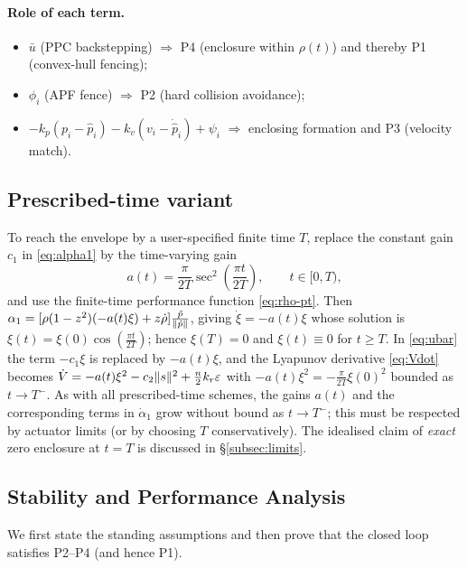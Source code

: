 \paragraph{Role of each term.}
\begin{itemize}
    \item $\bar u$ (PPC backstepping) $\Rightarrow$ P4 (enclosure within
    $\rho(t)$) and thereby P1 (convex-hull fencing);
    \item $\phi_i$ (APF fence) $\Rightarrow$ P2 (hard collision avoidance);
    \item $-k_p(p_i-\hat p_i)-k_v(v_i-\dot{\hat p}_i)+\psi_i$
    $\Rightarrow$ enclosing formation and P3 (velocity match).
\end{itemize}

\subsection{Prescribed-time variant}
\label{subsec:pt}

To reach the envelope by a user-specified finite time $T$, replace the
constant gain $c_1$ in \eqref{eq:alpha1} by the time-varying gain
\begin{equation}
a(t) = \frac{\pi}{2T}\sec^2\!\left(\frac{\pi t}{2T}\right),
\qquad t\in[0,T),
\label{eq:at}
\end{equation}
and use the finite-time performance function \eqref{eq:rho-pt}. Then
$\alpha_1 = [\rho(1-z^2)(-a(t)\xi)+z\dot\rho]\frac{\tilde p}{\lVert \tilde p \rVert}$,
giving $\dot\xi = -a(t)\xi$ whose solution is
$\xi(t)=\xi(0)\cos(\frac{\pi t}{2T})$; hence $\xi(T)=0$ and
$\xi(t)\equiv0$ for $t\ge T$. In \eqref{eq:ubar} the term
$-c_1\xi$ is replaced by $-a(t)\xi$, and the Lyapunov derivative
\eqref{eq:Vdot} becomes
$\dot V = -a(t)\xi^2 - c_2\lVert s \rVert^2 + \tfrac{n}{2}k_r\varepsilon$ with
$-a(t)\xi^2 = -\frac{\pi}{2T}\xi(0)^2$ bounded as $t\to T^-$.
As with all prescribed-time schemes, the gains $a(t)$ and the corresponding
terms in $\dot\alpha_1$ grow without bound as $t\to T^-$; this must be
respected by actuator limits (or by choosing $T$ conservatively). The
idealised claim of \emph{exact} zero enclosure at $t=T$ is discussed in
\S\ref{subsec:limits}.

\subsection{Stability and Performance Analysis}
\label{sec:analysis}

We first state the standing assumptions and then prove that the closed loop
satisfies P2--P4 (and hence P1).

